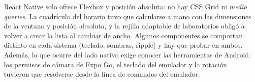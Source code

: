 
React Native solo ofrece Flexbox y posición absoluta: no hay CSS Grid ni \textit{media queries}. La cuadrícula del horario tuvo que calcularse a mano con las dimensiones de la ventana y posición absoluta, y la rejilla adaptable de laboratorios obligó a volver a crear la lista al cambiar de ancho. Algunos componentes se comportan distinto en cada sistema (teclado, sombras, ripple) y hay que probar en ambos. Además, lo que ocurre del lado nativo exige conocer las herramientas de Android: los permisos de cámara de Expo Go, el teclado del emulador y la rotación tuvieron que resolverse desde la línea de comandos del emulador.

